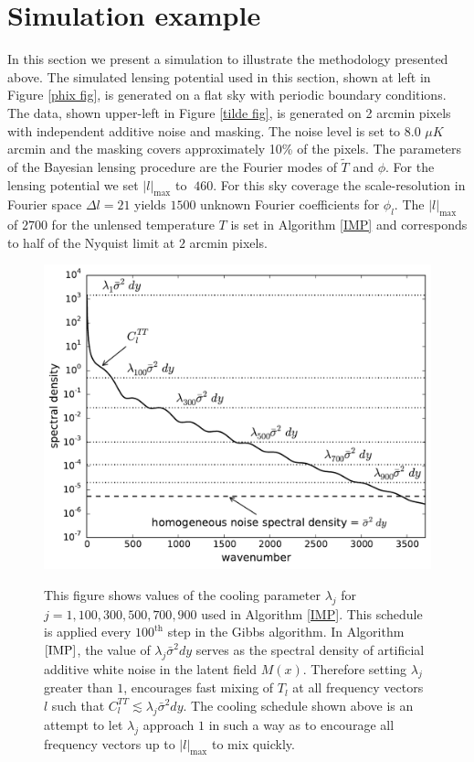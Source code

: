 \documentclass[iop,revtex4,apj,onecolumn]{emulateapj}
\begin{document}
%
%
\section{Simulation example}
\label{Section: simulation examples}

In this section we present a simulation to illustrate the methodology presented above. The simulated lensing potential used in this section, shown at left in Figure \ref{phix fig}, is generated on a flat sky with periodic boundary conditions. The data, shown upper-left in Figure \ref{tilde fig}, is generated on 2 arcmin pixels with independent additive noise and masking. The noise level is set to $8.0$ $\mu K$ arcmin and the masking covers approximately 10\% of the pixels.  The parameters of the Bayesian lensing procedure are the Fourier modes of $\widetilde T$ and $\phi$. For the lensing potential we set $|l|_\text{max}$ to $~460$. 
For this sky coverage the scale-resolution in Fourier space  $\Delta l = 21$ yields $1500$ unknown Fourier coefficients for $\phi_l$. The $|l|_\text{max}$ of $2700$ for the unlensed temperature $T$ is set in Algorithm \ref{IMP} and corresponds to half of the Nyquist limit at $2$ arcmin pixels. 


\begin{figure}
\begin{center}
  {\includegraphics[width=.5\hsize]{figure4.pdf}}
\end{center}
\caption{
\label{cooling}
This figure shows values of the cooling parameter $\lambda_j$ for $j=1,100, 300, 500, 700, 900$ used in Algorithm \ref{IMP}.  This schedule is applied every $100^\text{th}$ step in the Gibbs algorithm.  In Algorithm $\ref{IMP}$, the value of $\lambda_j\bar{\sigma}^2dy$ serves as the spectral density of artificial additive white noise in the latent field $M(x)$. Therefore setting $\lambda_j$ greater than $1$,  encourages fast mixing of $T_l$ at all frequency vectors $l$ such that $C_l^{TT} \lesssim \lambda_j\bar{\sigma}^2dy$. The cooling schedule shown above is an attempt to let $\lambda_j$ approach $1$ in such a way as to encourage all frequency vectors up to $|l|_\text{max}$ to mix quickly. 
 }
\end{figure}
\end{document}
